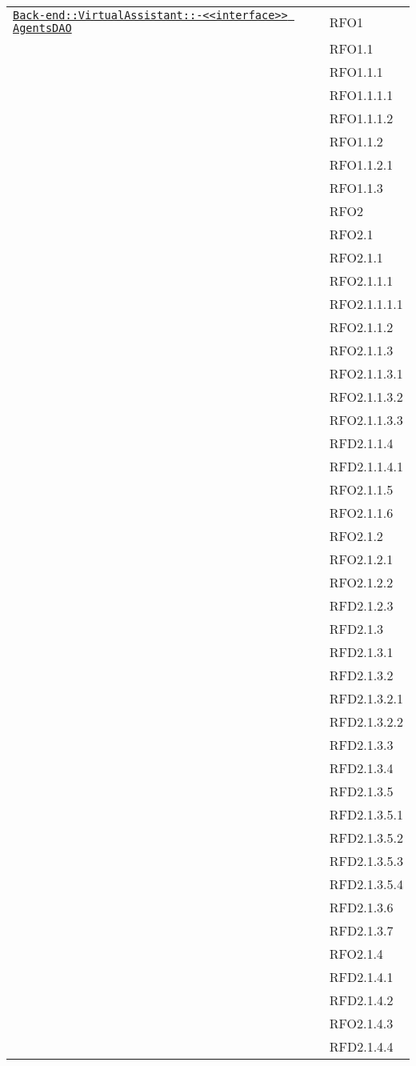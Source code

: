 \begin{longtable}{|>{\centering}m{10cm}|m{3cm}<{\centering}|}
\hyperref[Back-end::VirtualAssistant::<<interface>> AgentsDAO]{\texttt{Back-end::VirtualAssistant::-\linebreak <<interface>> AgentsDAO}} & RFO1\\
& RFO1.1\\
& RFO1.1.1\\
& RFO1.1.1.1\\
& RFO1.1.1.2\\
& RFO1.1.2\\
& RFO1.1.2.1\\
& RFO1.1.3\\
& RFO2\\
& RFO2.1\\
& RFO2.1.1\\
& RFO2.1.1.1\\
& RFO2.1.1.1.1\\
& RFO2.1.1.2\\
& RFO2.1.1.3\\
& RFO2.1.1.3.1\\
& RFO2.1.1.3.2\\
& RFO2.1.1.3.3\\
& RFD2.1.1.4\\
& RFD2.1.1.4.1\\
& RFO2.1.1.5\\
& RFO2.1.1.6\\
& RFO2.1.2\\
& RFO2.1.2.1\\
& RFO2.1.2.2\\
& RFD2.1.2.3\\
& RFD2.1.3\\
& RFD2.1.3.1\\
& RFD2.1.3.2\\
& RFD2.1.3.2.1\\
& RFD2.1.3.2.2\\
& RFD2.1.3.3\\
& RFD2.1.3.4\\
& RFD2.1.3.5\\
& RFD2.1.3.5.1\\
& RFD2.1.3.5.2\\
& RFD2.1.3.5.3\\
& RFD2.1.3.5.4\\
& RFD2.1.3.6\\
& RFD2.1.3.7\\
& RFO2.1.4\\
& RFD2.1.4.1\\
& RFD2.1.4.2\\
& RFO2.1.4.3\\
& RFD2.1.4.4\\

\end{longtable}
